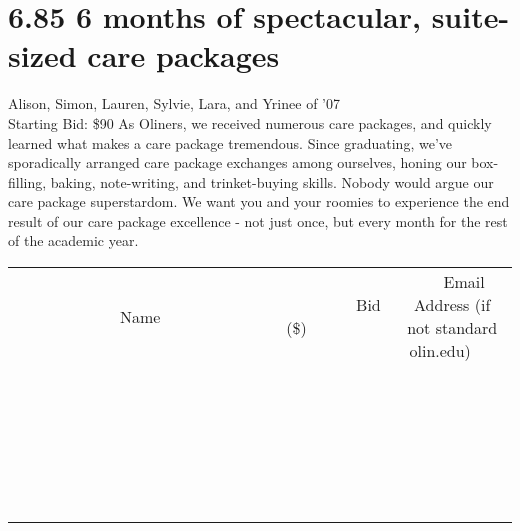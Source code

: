 \documentclass[11pt]{article}
\begin{document}
\section*{6.85 6 months of spectacular, suite-sized care packages}
Alison, Simon, Lauren, Sylvie, Lara, and Yrinee of '07
\\
Starting Bid: \$90
\newline
As Oliners, we received numerous care packages, and quickly learned what makes a care package tremendous. Since graduating, we've sporadically arranged care package exchanges among ourselves, honing our box-filling, baking, note-writing, and trinket-buying skills. Nobody would argue our care package superstardom. We want you and your roomies to experience the end result of our care package excellence - not just once, but every month for the rest of the academic year.
\\[6ex]
\begin{tabular}{c c c}
~~~~~~~~~~~~~Name~~~~~~~~~~~~~ & ~~~~~~~~~Bid (\$)~~~~~~~~~  & ~~~Email Address (if not standard olin.edu)~~~\\
 & & \\
\hline
 & & \\
\hline
 & & \\
\hline
 & & \\
\hline
 & & \\
\hline
 & & \\
\hline
 & & \\
\hline
 & & \\
\hline
 & & \\
\hline
 & & \\
\hline
 & & \\
\hline
 & & \\
\hline
 & & \\
\hline
 & & \\
\hline
 & & \\
\hline
 & & \\
\hline
 & & \\
\hline
 & & \\
\hline
 & & \\
\hline
 & & \\
\hline
 & & \\
\hline
 & & \\
\hline
 & & \\
\hline
 & & \\
\hline
 & & \\
\hline
 & & \\
\hline
\end{tabular}
\newpage
\end{document}
